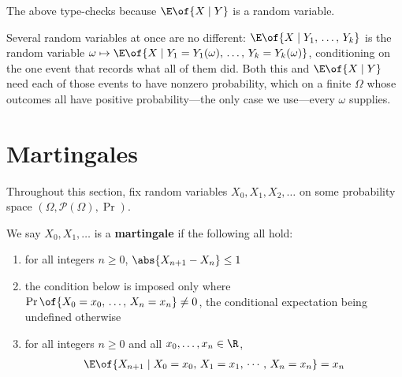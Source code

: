 The above type-checks because $\E\of{X \mid Y}$ is a random variable.

Several random variables at once are no different: $\E\of{X \mid Y_1, \, \ldots, \, Y_k}$ is the random variable $\omega \mapsto \E\of{X \mid Y_1 = Y_1(\omega), \, \ldots, \, Y_k = Y_k(\omega)}$, conditioning on the one event that records what all of them did. Both this and $\E\of{X \mid Y}$ need each of those events to have nonzero probability, which on a finite $\Omega$ whose outcomes all have positive probability---the only case we use---every $\omega$ supplies.

\section{Martingales}

Throughout this section, fix random variables $X_0, X_1, X_2, \ldots$ on some probability space $(\Omega, \mathcal{P}(\Omega), \Pr)$.

\begin{boxdefinition}[Martingale]
    We say $X_0, X_1, \ldots$ is a \textbf{martingale} if the following all hold:
    \begin{enumerate}
        \item for all integers $n \geq 0$, $\abs{X_{n+1} - X_n} \leq 1$
        \item the condition below is imposed only where $\Pr\of{X_0 = x_0, \, \ldots, \, X_n = x_n} \neq 0$, the conditional expectation being undefined otherwise
        \item for all integers $n \geq 0$ and all $x_0, \ldots, x_n \in \R$,
        \begin{align*}
            \E\of{X_{n + 1} \mid X_0 = x_0, \, X_1 = x_1, \, \cdots, \, X_n = x_n} = x_n
        \end{align*}
    \end{enumerate}
\end{boxdefinition}

